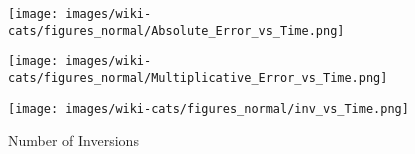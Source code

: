 \begin{figure*}[htbp]
	\ContinuedFloat
	\centering

	\begin{subfigure}[b]{\textwidth}
		\centering
		\begin{minipage}[b]{0.05\textwidth}
			\centering
		\end{minipage}%
		\begin{minipage}[b]{0.3\textwidth}
			\centering
			\caption*{Global Error}
			\texttt{[image: images/wiki-cats/figures\_normal/Absolute\_Error\_vs\_Time.png]} %
			
		\end{minipage}%
		\begin{minipage}[b]{0.3\textwidth}
			\centering
			\caption*{Local Error}
			\texttt{[image: images/wiki-cats/figures\_normal/Multiplicative\_Error\_vs\_Time.png]} %
			
		\end{minipage}%
		\begin{minipage}[b]{0.3\textwidth}
			\centering
				\caption*{Number of Inversions}
			\texttt{[image: images/wiki-cats/figures\_normal/inv\_vs\_Time.png]} %
		\end{minipage}
	\end{subfigure}


\end{figure*}
